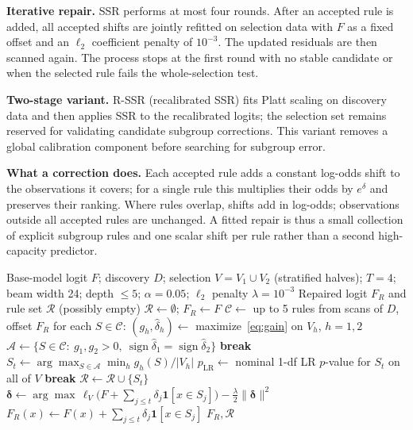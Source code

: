 \documentclass[conference]{IEEEtran}
\begin{document}
\textbf{Iterative repair.} SSR performs at most four rounds. After an accepted rule is
added, all accepted shifts are jointly refitted on selection data with $F$ as a fixed offset and an
$\ell_2$ coefficient penalty of $10^{-3}$. The updated residuals are then scanned again. The process
stops at the first round with no stable candidate or when the selected rule fails the whole-selection
test.

\textbf{Two-stage variant.} R-SSR (recalibrated SSR) fits Platt scaling on discovery data and then applies
SSR to the recalibrated logits; the selection set remains reserved for validating
candidate subgroup corrections. This variant removes a global calibration component before searching
for subgroup error.

\textbf{What a correction does.} Each accepted rule adds a constant log-odds shift to the
observations it covers; for a single rule this multiplies their odds by $e^{\delta}$ and preserves
their ranking. Where rules overlap, shifts add in log-odds; observations outside all accepted rules
are unchanged. A fitted repair is thus a small collection of explicit
subgroup rules and one scalar shift per rule rather than a second high-capacity predictor.

\begin{algorithm}[!t]
\caption{Structured Scan Repair (SSR)}
\label{alg:ssr}
\small
\begin{algorithmic}[1]
\Require Base-model logit $F$; discovery $D$; selection $V=V_1\cup V_2$ (stratified halves);
$T=4$; beam width 24; depth $\leq5$; $\alpha=0.05$; $\ell_2$ penalty $\lambda=10^{-3}$
\Ensure Repaired logit $F_R$ and rule set $\mathcal R$ (possibly empty)
\State $\mathcal R\gets\emptyset$; $F_R\gets F$
    \State $\mathcal C\gets$ up to 5 rules from scans of $D$, offset $F_R$
    \State for each $S\in\mathcal C$: $(g_h,\hat\delta_h)\gets$ maximize~\eqref{eq:gain} on $V_h$, $h=1,2$
    \State $\mathcal A\gets\{S\in\mathcal C:\ g_1,g_2>0,\ \operatorname{sign}\hat\delta_1=\operatorname{sign}\hat\delta_2\}$
        \State \textbf{break} 
    \EndIf
    \State $S_t\gets\arg\max_{S\in\mathcal A}\min_h g_h(S)/|V_h|$ 
    \State $p_{\mathrm{LR}}\gets$ nominal 1-df LR $p$-value for $S_t$ on all of $V$
        \State \textbf{break} 
    \EndIf
    \State $\mathcal R\gets\mathcal R\cup\{S_t\}$
    \State $\boldsymbol\delta\gets\arg\max\,\ell_V\big(F+\sum_{j\le t}\delta_j\mathbf{1}[x\in S_j]\big)
    -\tfrac{\lambda}{2}\|\boldsymbol\delta\|^2$
    \State $F_R(x)\gets F(x)+\sum_{j\le t}\delta_j\mathbf{1}[x\in S_j]$
\EndFor
\State \Return $F_R,\mathcal R$
\end{algorithmic}
\end{algorithm}
\end{document}
